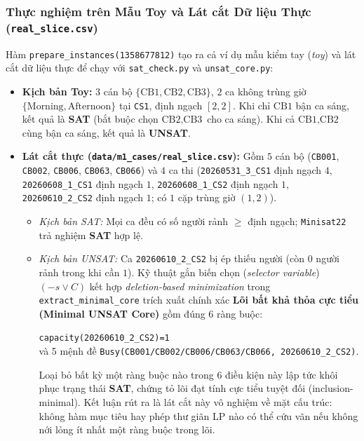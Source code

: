 \subsubsection{Thực nghiệm trên Mẫu Toy và Lát cắt Dữ liệu Thực (\texttt{real\_slice.csv})}
Hàm \texttt{prepare\_instances(1358677812)} tạo ra cả ví dụ mẫu kiểm tay (\textit{toy}) và lát cắt dữ liệu thực để chạy với \texttt{sat\_check.py} và \texttt{unsat\_core.py}:
\begin{itemize}
    \item \textbf{Kịch bản Toy:} $3$ cán bộ $\{\text{CB1}, \text{CB2}, \text{CB3}\}$, $2$ ca không trùng giờ $\{\text{Morning}, \text{Afternoon}\}$ tại \texttt{CS1}, định ngạch $[2, 2]$. Khi chỉ $\text{CB1}$ bận ca sáng, kết quả là \textbf{SAT} (bắt buộc chọn $\text{CB2}, \text{CB3}$ cho ca sáng). Khi cả $\text{CB1}, \text{CB2}$ cùng bận ca sáng, kết quả là \textbf{UNSAT}.
    \item \textbf{Lát cắt thực (\texttt{data/m1\_cases/real\_slice.csv}):} Gồm $5$ cán bộ (\texttt{CB001}, \texttt{CB002}, \texttt{CB006}, \texttt{CB063}, \texttt{CB066}) và $4$ ca thi (\texttt{20260531\_3\_CS1} định ngạch $4$, \texttt{20260608\_1\_CS1} định ngạch $1$, \texttt{20260608\_1\_CS2} định ngạch $1$, \texttt{20260610\_2\_CS2} định ngạch $1$; có $1$ cặp trùng giờ $(1, 2)$).
    \begin{itemize}
        \item \textit{Kịch bản SAT:} Mọi ca đều có số người rảnh $\ge$ định ngạch; \texttt{Minisat22} trả nghiệm \textbf{SAT} hợp lệ.
        \item \textit{Kịch bản UNSAT:} Ca \texttt{20260610\_2\_CS2} bị ép thiếu người (còn $0$ người rảnh trong khi cần $1$). Kỹ thuật gắn biến chọn (\textit{selector variable}) $(-s \lor C)$ kết hợp \textit{deletion-based minimization} trong \texttt{extract\_minimal\_core} trích xuất chính xác \textbf{Lõi bất khả thỏa cực tiểu (Minimal UNSAT Core)} gồm đúng $6$ ràng buộc:
        \begin{center}
            \small
            \texttt{capacity(20260610\_2\_CS2)=1} \\
            và 5 mệnh đề \texttt{Busy(CB001/CB002/CB006/CB063/CB066, 20260610\_2\_CS2)}.
        \end{center}
        Loại bỏ bất kỳ một ràng buộc nào trong $6$ điều kiện này lập tức khôi phục trạng thái \textbf{SAT}, chứng tỏ lõi đạt tính cực tiểu tuyệt đối (inclusion-minimal). Kết luận rút ra là lát cắt này vô nghiệm về mặt cấu trúc: không hàm mục tiêu hay phép thư giãn LP nào có thể cứu vãn nếu không nới lỏng ít nhất một ràng buộc trong lõi.
    \end{itemize}
\end{itemize}

